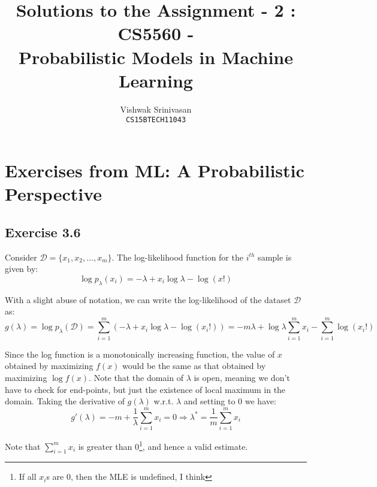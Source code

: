 \documentclass{article}
\title{Solutions to the Assignment - 2 : CS5560 - \\
Probabilistic Models in Machine Learning}
\author{Vishwak Srinivasan\\
\texttt{CS15BTECH11043}}
\date{}
\begin{document}
\maketitle

\section*{Exercises from ML: A Probabilistic Perspective}
\subsection*{Exercise 3.6}
\begin{flushleft}
Consider \(\mathcal{D} = \{x_{1}, x_{2}, \ldots, x_{m}\}\). The log-likelihood function for the \(i^{th}\) sample is given by:
\begin{equation}
\log p_{\lambda}(x_{i}) = -\lambda + x_{i} \log \lambda - \log (x!)
\end{equation}

With a slight abuse of notation, we can write the log-likelihood of the dataset \(\mathcal{D}\) as:
\begin{equation}
g(\lambda) = \log p_{\lambda}(\mathcal{D}) = \sum_{i=1}^{m} \left(-\lambda + x_{i} \log \lambda - \log (x_{i}!)\right) = -m\lambda + \log \lambda \displaystyle \sum_{i=1}^{m} x_{i} - \sum_{i=1}^{m} \log(x_{i}!)
\end{equation}

Since the log function is a monotonically increasing function, the value of \(x\) obtained by maximizing \(f(x)\) would be the same as that obtained by maximizing \(\log f(x)\). Note that the domain of \(\lambda\) is open, meaning we don't have to check for end-points, but just the existence of local maximum in the domain. Taking the derivative of \(g(\lambda)\) w.r.t. \(\lambda\) and setting to 0 we have:
\begin{equation}
g'(\lambda) = -m + \frac{1}{\lambda} \sum_{i=1}^{m} x_{i} = 0 \Rightarrow \lambda^{*} = \frac{1}{m} \sum_{i=1}^{m} x_{i}
\end{equation}

Note that \(\displaystyle \sum_{i=1}^{m} x_{i}\) is greater than 0\footnote{If all \(x_{i}\)s are 0, then the MLE is undefined, I think}, and hence a valid estimate.
\end{flushleft}
\end{document}
